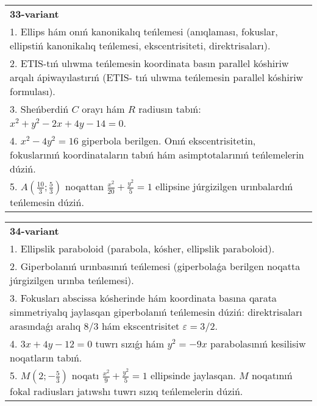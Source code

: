 \documentclass{article}
\begin{document}
\begin{tabular}{m{17cm}}
\textbf{33-variant}\\
1. Ellips hám onıń kanonikalıq teńlemesi (anıqlaması, fokuslar, ellipstiń kanonikalıq teńlemesi, ekscentrisiteti, direktrisaları).\\

2. ETIS-tıń ulıwma teńlemesin koordinata basın parallel kóshiriw arqalı ápiwayılastırıń (ETIS- tıń ulıwma teńlemesin parallel kóshiriw formulası).\\

3. Sheńberdiń $C$ orayı hám $R$ radiusın tabıń: $x^2+y^2-2 x+4 y-14=0$.\\

4. $x^{2} - 4y^{2} = 16$ giperbola berilgen. Onıń ekscentrisitetin, fokuslarınıń koordinataların tabıń hám asimptotalarınıń teńlemelerin dúziń.\\

5. $A(\frac{10}{3};\frac{5}{3})$ noqattan $\frac{x^{2}}{20} + \frac{y^{2}}{5} = 1$ ellipsine júrgizilgen urınbalardıń teńlemesin dúziń.  
\end{tabular}
\vspace{1cm}


\begin{tabular}{m{17cm}}
\textbf{34-variant}\\
1. Ellipslik paraboloid (parabola, kósher, ellipslik paraboloid).\\

2. Giperbolanıń urınbasınıń teńlemesi (giperbolaǵa berilgen noqatta júrgizilgen urınba teńlemesi).\\

3. Fokusları abscissa kósherinde hám koordinata basına qarata simmetriyalıq jaylasqan giperbolanıń teńlemesin dúziń: direktrisaları arasındaǵı aralıq $8/3$ hám ekscentrisitet $\varepsilon=3/2$.\\

4. $3x + 4y - 12 = 0$ tuwrı sızıǵı hám $y^{2} = - 9x$ parabolasınıń kesilisiw noqatların tabıń.  \\

5. $M(2; - \frac{5}{3})$ noqatı $\frac{x^{2}}{9} + \frac{y^{2}}{5} = 1$ ellipsinde jaylasqan. $M$ noqatınıń fokal radiusları jatıwshı tuwrı sızıq teńlemelerin dúziń.  
\end{tabular}
\vspace{1cm}
\end{document}
